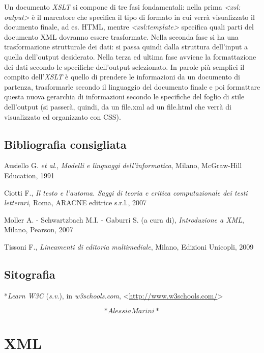 \documentclass[
  b5paper,
  twoside,
  11pt,
  chapterprefix=false,
  bibliography=totocnumbered,
  listof=flat]{scrbook}
\begin{document}
Un documento \emph{XSLT} si compone di tre fasi fondamentali: nella prima
\emph{\textless xsl: output\textgreater{}} è il marcatore che specifica il tipo di formato in cui
verrà visualizzato il documento finale, ad es. HTML, mentre
\emph{\textless xsl:template\textgreater{}} specifica quali parti del documento XML dovranno
essere trasformate. Nella seconda fase si ha una trasformazione
strutturale dei dati: si passa quindi dalla struttura dell'input a
quella dell'output desiderato. Nella terza ed ultima fase avviene la
formattazione dei dati secondo le specifiche dell'output selezionato. In
parole più semplici il compito dell'\emph{XSLT} è quello di prendere le
informazioni da un documento di partenza, trasformarle secondo il
linguaggio del documento finale e poi formattare questa nuova gerarchia
di informazioni secondo le specifiche del foglio di stile dell'output
(si passerà, quindi, da un file.xml ad un file.html che verrà di
visualizzato ed organizzato con CSS).

\hypertarget{bibliografia-consigliata-26}{%
\section*{Bibliografia consigliata}\label{bibliografia-consigliata-26}}

Ausiello G. \emph{et al}., \emph{Modelli e linguaggi dell'informatica}, Milano,
McGraw-Hill Education, 1991

Ciotti F., \emph{Il testo e l'automa. Saggi di teoria e critica
computazionale dei testi letterari}, Roma, ARACNE editrice s.r.l., 2007

Moller A. - Schwartzbach M.I. - Gaburri S. (a cura di), \emph{Introduzione a
XML}, Milano, Pearson, 2007

Tissoni F., \emph{Lineamenti di editoria multimediale}, Milano, Edizioni
Unicopli, 2009

\hypertarget{sitografia-31}{%
\section*{Sitografia}\label{sitografia-31}}

*\emph{Learn W3C} (\emph{s.v}.), in \emph{w3schools.com},
\textless{}{\url{http://www.w3schools.com/}\textgreater{}}

\[*Alessia Marini*\]

\hypertarget{xml}{%
\chapter{XML}\label{xml}}
\end{document}
